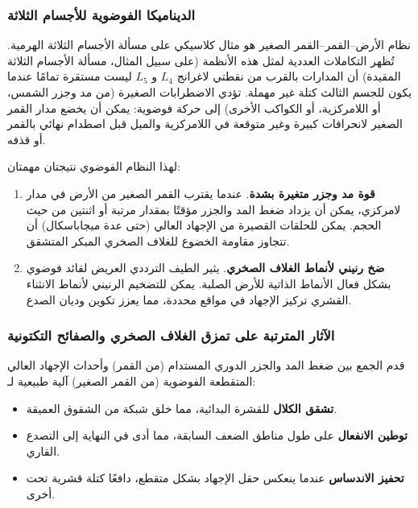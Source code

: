 \documentclass[11pt,a4paper]{article}
\begin{document}
	\subsubsection{الديناميكا الفوضوية للأجسام الثلاثة}
	
	نظام الأرض–القمر–القمر الصغير هو مثال كلاسيكي على مسألة الأجسام الثلاثة الهرمية. تُظهر التكاملات العددية لمثل هذه الأنظمة (على سبيل المثال، مسألة الأجسام الثلاثة المقيدة) أن المدارات بالقرب من نقطتي لاغرانج \(L_{4}\) و \(L_{5}\) ليست مستقرة تمامًا عندما يكون للجسم الثالث كتلة غير مهملة. تؤدي الاضطرابات الصغيرة (من مد وجزر الشمس، أو اللامركزية، أو الكواكب الأخرى) إلى حركة فوضوية: يمكن أن يخضع مدار القمر الصغير لانحرافات كبيرة وغير متوقعة في اللامركزية والميل قبل اصطدام نهائي بالقمر أو قذفه.
	
	لهذا النظام الفوضوي نتيجتان مهمتان:
	
	\begin{enumerate}
		\item \textbf{قوة مد وجزر متغيرة بشدة}. عندما يقترب القمر الصغير من الأرض في مدار لامركزي، يمكن أن يزداد ضغط المد والجزر مؤقتًا بمقدار مرتبة أو اثنتين من حيث الحجم. يمكن للحلقات القصيرة من الإجهاد العالي (حتى عدة ميجاباسكال) أن تتجاوز مقاومة الخضوع للغلاف الصخري المبكر المتشقق.
		\item \textbf{ضخ رنيني لأنماط الغلاف الصخري}. يثير الطيف الترددي العريض لقائد فوضوي بشكل فعال الأنماط الذاتية للأرض الصلبة. يمكن للتضخيم الرنيني لأنماط الانثناء القشري تركيز الإجهاد في مواقع محددة، مما يعزز تكوين وديان الصدع.
	\end{enumerate}
	
	\subsubsection{الآثار المترتبة على تمزق الغلاف الصخري والصفائح التكتونية}
	
	قدم الجمع بين ضغط المد والجزر الدوري المستدام (من القمر) وأحداث الإجهاد العالي المتقطعة الفوضوية (من القمر الصغير) آلية طبيعية لـ:
	
	\begin{itemize}
		\item \textbf{تشقق الكلال} للقشرة البدائية، مما خلق شبكة من الشقوق العميقة.
		\item \textbf{توطين الانفعال} على طول مناطق الضعف السابقة، مما أدى في النهاية إلى التصدع القاري.
		\item \textbf{تحفيز الاندساس} عندما ينعكس حقل الإجهاد بشكل متقطع، دافعًا كتلة قشرية تحت أخرى.
	\end{itemize}
	
\end{document}
